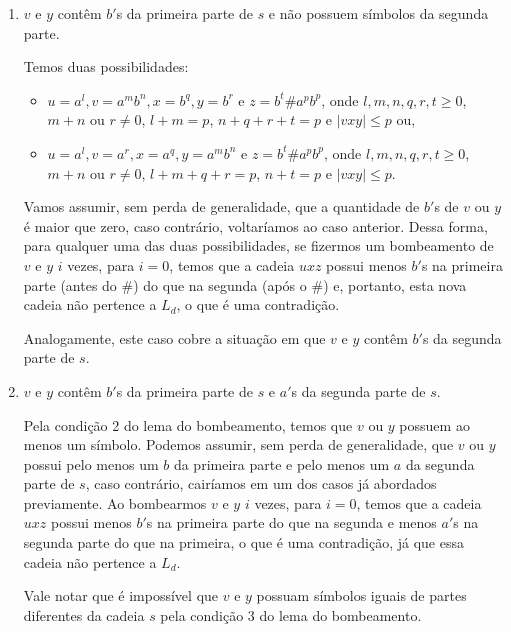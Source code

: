 \begin{enumerate}[label={\textbf{\alph*.}}]
\begin{enumerate}[label={\textbf{Caso \arabic*:}}]
        \item $v$ e $y$ contêm $b'$s da primeira parte de $s$ e não possuem símbolos da segunda parte.
        
        Temos duas possibilidades:
        \begin{itemize}
            \item $u = a^l, v = a^mb^n, x = b^q, y = b^r$ e $z = b^t\#a^pb^p$, onde $l, m, n, q, r, t \geq 0$, $m + n$ ou $r \neq 0$, $l + m = p$, $n + q + r + t = p$ e $|vxy| \leq p$ ou,
            
            \item $u = a^l, v = a^r, x = a^q, y = a^mb^n$ e $z = b^t\#a^pb^p$, onde $l, m, n, q, r, t \geq 0$, $m + n$ ou $r \neq 0$, $l + m + q + r = p$, $n + t = p$ e $|vxy| \leq p$.
        \end{itemize}
        
        Vamos assumir, sem perda de generalidade, que a quantidade de $b'$s de $v$ ou $y$ é maior que zero, caso contrário, voltaríamos ao caso anterior. Dessa forma, para qualquer uma das duas possibilidades, se fizermos um bombeamento de $v$ e $y$ $i$ vezes, para $i = 0$, temos que a cadeia $uxz$ possui menos $b'$s na primeira parte (antes do $\#$) do que na segunda (após o $\#$) e, portanto, esta nova cadeia não pertence a $L_d$, o que é uma contradição.
        
        Analogamente, este caso cobre a situação em que $v$ e $y$ contêm $b'$s da segunda parte de $s$.

        \item $v$ e $y$ contêm $b'$s da primeira parte de $s$ e $a'$s da segunda parte de $s$.
        
        Pela condição 2 do lema do bombeamento, temos que $v$ ou $y$ possuem ao menos um símbolo. Podemos assumir, sem perda de generalidade, que $v$ ou $y$ possui pelo menos um $b$ da primeira parte e pelo menos um $a$ da segunda parte de $s$, caso contrário, cairíamos em um dos casos já abordados previamente. Ao bombearmos $v$ e $y$ $i$ vezes, para $i = 0$, temos que a cadeia $uxz$ possui menos $b'$s na primeira parte do que na segunda e menos $a'$s na segunda parte do que na primeira, o que é uma contradição, já que essa cadeia não pertence a $L_d$.
        
        Vale notar que é impossível que $v$ e $y$ possuam símbolos iguais de partes diferentes da cadeia $s$ pela condição 3 do lema do bombeamento.
    \end{enumerate}

\end{enumerate}